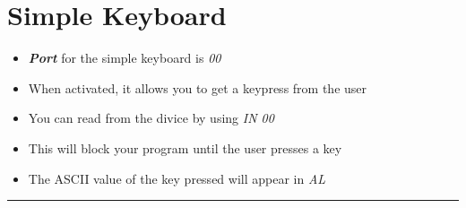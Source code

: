 \documentclass{article}
\begin{document}
\section{Simple Keyboard}
\begin{itemize}
  \item{\textbf{\textit{Port}} for the simple keyboard is \textit{00}}
  \item{When activated, it allows you to get a keypress from the user}
  \item{You can read from the divice by using \textit{IN 00}}
  \item{This will block your program until the user presses a key}
  \item{The ASCII value of the key pressed will appear in \textit{AL}}
\end{itemize}

\begin{center}
  \rule{.5\textwidth}{0.4pt}
\end{center}
\end{document}
